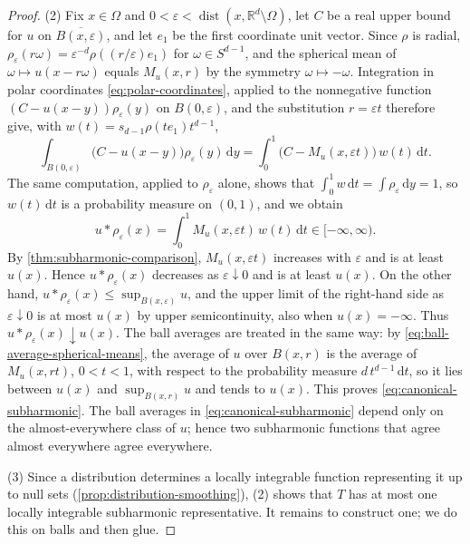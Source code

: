 \begin{proof}
(2) Fix $x\in\Omega$ and $0<\varepsilon<\operatorname{dist}(x,\mathbb R^d\setminus\Omega)$, let $C$ be a real upper bound for $u$ on $\overline{B(x,\varepsilon)}$, and let $e_1$ be the first coordinate unit vector. Since $\rho$ is radial, $\rho_\varepsilon(r\omega)=\varepsilon^{-d}\rho((r/\varepsilon)e_1)$ for $\omega\in S^{d-1}$, and the spherical mean of $\omega\mapsto u(x-r\omega)$ equals $M_u(x,r)$ by the symmetry $\omega\mapsto-\omega$. Integration in polar coordinates \eqref{eq:polar-coordinates}, applied to the nonnegative function $(C-u(x-y))\rho_\varepsilon(y)$ on $B(0,\varepsilon)$, and the substitution $r=\varepsilon t$ therefore give, with $w(t)=s_{d-1}\rho(te_1)t^{d-1}$,
\[
 \int_{B(0,\varepsilon)}\bigl(C-u(x-y)\bigr)\rho_\varepsilon(y)\,\mathrm d y=\int_0^1\bigl(C-M_u(x,\varepsilon t)\bigr)\,w(t)\,\mathrm d t.
\]
The same computation, applied to $\rho_\varepsilon$ alone, shows that $\int_0^1w\,\mathrm dt=\int\rho_\varepsilon\,\mathrm dy=1$, so $w(t)\,\mathrm dt$ is a probability measure on $(0,1)$, and we obtain
\[
 u*\rho_\varepsilon(x)=\int_0^1M_u(x,\varepsilon t)\,w(t)\,\mathrm d t\in[-\infty,\infty).
\]
By \cref{thm:subharmonic-comparison}, $M_u(x,\varepsilon t)$ increases with $\varepsilon$ and is at least $u(x)$. Hence $u*\rho_\varepsilon(x)$ decreases as $\varepsilon\downarrow0$ and is at least $u(x)$. On the other hand, $u*\rho_\varepsilon(x)\leq\sup_{B(x,\varepsilon)}u$, and the upper limit of the right-hand side as $\varepsilon\downarrow0$ is at most $u(x)$ by upper semicontinuity, also when $u(x)=-\infty$. Thus $u*\rho_\varepsilon(x)\downarrow u(x)$. The ball averages are treated in the same way: by \eqref{eq:ball-average-spherical-means}, the average of $u$ over $B(x,r)$ is the average of $M_u(x,rt)$, $0<t<1$, with respect to the probability measure $d\,t^{d-1}\,\mathrm d t$, so it lies between $u(x)$ and $\sup_{B(x,r)}u$ and tends to $u(x)$. This proves \eqref{eq:canonical-subharmonic}. The ball averages in \eqref{eq:canonical-subharmonic} depend only on the almost-everywhere class of $u$; hence two subharmonic functions that agree almost everywhere agree everywhere.

(3) Since a distribution determines a locally integrable function representing it up to null sets (\cref{prop:distribution-smoothing}), (2) shows that $T$ has at most one locally integrable subharmonic representative. It remains to construct one; we do this on balls and then glue.


\end{proof}
